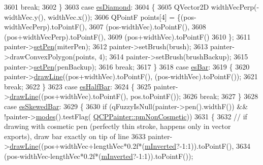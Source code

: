\begin{DoxyCode}
3601       \textcolor{keywordflow}{break};
3602     \}
3603     \textcolor{keywordflow}{case} \hyperlink{class_q_c_p_line_ending_a5ef16e6876b4b74959c7261d8d4c2cd5a378fe5a8b768411b0bc1765210fe7200}{esDiamond}:
3604     \{
3605       QVector2D widthVecPerp(-widthVec.y(), widthVec.x());
3606       QPointF points[4] = \{(pos-widthVecPerp).toPointF(),
3607                            (pos-widthVec).toPointF(),
3608                            (pos+widthVecPerp).toPointF(),
3609                            (pos+widthVec).toPointF()
3610                           \};
3611       painter->\hyperlink{class_q_c_p_painter_af9c7a4cd1791403901f8c5b82a150195}{setPen}(miterPen);
3612       painter->setBrush(brush);
3613       painter->drawConvexPolygon(points, 4);
3614       painter->setBrush(brushBackup);
3615       painter->\hyperlink{class_q_c_p_painter_af9c7a4cd1791403901f8c5b82a150195}{setPen}(penBackup);
3616       \textcolor{keywordflow}{break};
3617     \}
3618     \textcolor{keywordflow}{case} \hyperlink{class_q_c_p_line_ending_a5ef16e6876b4b74959c7261d8d4c2cd5a2cf543bbca332df26d89bf779f50469f}{esBar}:
3619     \{
3620       painter->\hyperlink{class_q_c_p_painter_a0b4b1b9bd495e182c731774dc800e6e0}{drawLine}((pos+widthVec).toPointF(), (pos-widthVec).toPointF());
3621       \textcolor{keywordflow}{break};
3622     \}
3623     \textcolor{keywordflow}{case} \hyperlink{class_q_c_p_line_ending_a5ef16e6876b4b74959c7261d8d4c2cd5a126c390f0c359fcd8df1fc5e38d26d5b}{esHalfBar}:
3624     \{
3625       painter->\hyperlink{class_q_c_p_painter_a0b4b1b9bd495e182c731774dc800e6e0}{drawLine}((pos+widthVec).toPointF(), pos.toPointF());
3626       \textcolor{keywordflow}{break};
3627     \}
3628     \textcolor{keywordflow}{case} \hyperlink{class_q_c_p_line_ending_a5ef16e6876b4b74959c7261d8d4c2cd5a2b2cc96e757ca9bcd91fb70221ed43ab}{esSkewedBar}:
3629     \{
3630       \textcolor{keywordflow}{if} (qFuzzyIsNull(painter->pen().widthF()) && !painter->\hyperlink{class_q_c_p_painter_a99b89eaf5363faaa1e1e6162856f436c}{modes}().testFlag(
      \hyperlink{class_q_c_p_painter_a156cf16444ff5e0d81a73c615fdb156dac1e481bfaf408f2bd2eaad3ec341f36b}{QCPPainter::pmNonCosmetic}))
3631       \{
3632         \textcolor{comment}{// if drawing with cosmetic pen (perfectly thin stroke, happens only in vector exports), draw bar
       exactly on tip of line}
3633         painter->\hyperlink{class_q_c_p_painter_a0b4b1b9bd495e182c731774dc800e6e0}{drawLine}((pos+widthVec+lengthVec*0.2f*(\hyperlink{class_q_c_p_line_ending_a91306fe771d54c955e0af21af14349d5}{mInverted}?-1:1)).toPointF(),
3634                           (pos-widthVec-lengthVec*0.2f*(\hyperlink{class_q_c_p_line_ending_a91306fe771d54c955e0af21af14349d5}{mInverted}?-1:1)).toPointF());

\end{DoxyCode}
